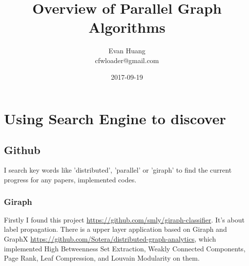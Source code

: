 \documentclass{article}
\title{Overview of Parallel Graph Algorithms}
\date{2017-09-19}
\author{Evan Huang \\ cfwloader@gmail.com}
\begin{document}


	\tableofcontents


	\newpage

	\section{Using Search Engine to discover}
	\subsection{Github}
	I search key words like 'distributed', 'parallel' or 'giraph' to find the current progress for any papers, implemented codes.
	\subsubsection{Giraph}
	Firstly I found this project \url{https://github.com/smly/giraph-classifier}. It's about label propagation.
	\newline
	There is a upper layer application based on Giraph and GraphX \url{https://github.com/Sotera/distributed-graph-analytics}, which implemented High Betweenness Set Extraction, Weakly Connected Components, Page Rank, Leaf Compression, and Louvain Modularity on them.
\end{document}
